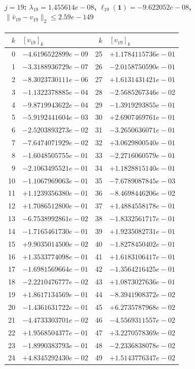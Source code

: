 \documentclass[11pt]{article}
\begin{document}
\paragraph{$j = 19$: $\lambda_{19} = 1.455614e-08$, \quad $\ell_{19}(\mathbf{1}) = -9.622052e-08$, \quad $\|\hat{v}_{19} - v_{19}\|_2 \leq 2.59e-149$}
\begin{center}
{\footnotesize
\begin{tabular}{r@{\;\;}l@{\quad}r@{\;\;}l}
\toprule
$k$ & $[v_{19}]_k$ & $k$ & $[v_{19}]_k$ \\
\midrule
0 & $-4.6196522899e-09$ & 25 & $+1.1784115736e-01$ \\
1 & $-3.3188936729e-07$ & 26 & $-2.0158750590e-01$ \\
2 & $-8.3023730111e-06$ & 27 & $+1.6131431421e-01$ \\
3 & $-1.1322378885e-04$ & 28 & $-2.5685267346e-02$ \\
4 & $-9.8719943622e-04$ & 29 & $-1.3919293855e-01$ \\
5 & $-5.9192441604e-03$ & 30 & $+2.6907469761e-01$ \\
6 & $-2.5203893273e-02$ & 31 & $-3.2650636071e-01$ \\
7 & $-7.6474071929e-02$ & 32 & $+3.0629800540e-01$ \\
8 & $-1.6048505755e-01$ & 33 & $-2.2716060579e-01$ \\
9 & $-2.1063495521e-01$ & 34 & $+1.1828815140e-01$ \\
10 & $-1.1067969063e-01$ & 35 & $-7.6789087845e-03$ \\
11 & $+1.1239356380e-01$ & 36 & $-8.4698446206e-02$ \\
12 & $+1.7086512800e-01$ & 37 & $+1.4884558178e-01$ \\
13 & $-6.7538992861e-02$ & 38 & $-1.8332561717e-01$ \\
14 & $-1.7165461730e-01$ & 39 & $+1.9235082731e-01$ \\
15 & $+9.9035014500e-02$ & 40 & $-1.8278450402e-01$ \\
16 & $+1.3533774098e-01$ & 41 & $+1.6183106417e-01$ \\
17 & $-1.6981569664e-01$ & 42 & $-1.3564216425e-01$ \\
18 & $-2.2210476777e-02$ & 43 & $+1.0873027636e-01$ \\
19 & $+1.8617134569e-01$ & 44 & $-8.3941908372e-02$ \\
20 & $-1.4361631722e-01$ & 45 & $+6.2735787968e-02$ \\
21 & $-4.4733303701e-02$ & 46 & $-4.5569311557e-02$ \\
22 & $+1.9568504377e-01$ & 47 & $+3.2270578369e-02$ \\
23 & $-1.8990383793e-01$ & 48 & $-2.2336838078e-02$ \\
24 & $+4.8345292430e-02$ & 49 & $+1.5143776347e-02$ \\
\bottomrule
\end{tabular}
}
\end{center}
\end{document}
